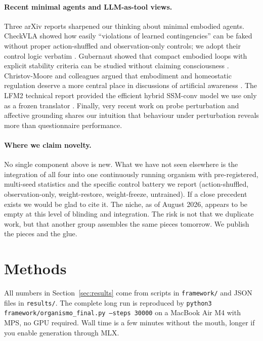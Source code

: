 \documentclass[11pt,a4paper]{article}
\begin{document}
\paragraph{Recent minimal agents and LLM-as-tool views.} Three arXiv reports sharpened our thinking about minimal embodied agents. CheckVLA showed how easily ``violations of learned contingencies'' can be faked without proper action-shuffled and observation-only controls; we adopt their control logic verbatim \cite{checkvla2026}. Gubernaut showed that compact embodied loops with explicit stability criteria can be studied without claiming consciousness \cite{gubernaut2026}. Christov-Moore and colleagues argued that embodiment and homeostatic regulation deserve a more central place in discussions of artificial awareness \cite{christovmoore2025}. The LFM2 technical report provided the efficient hybrid SSM-conv model we use only as a frozen translator \cite{lfm2025}. Finally, very recent work on probe perturbation and affective grounding \cite{probe2026} shares our intuition that behaviour under perturbation reveals more than questionnaire performance.

\paragraph{Where we claim novelty.} No single component above is new. What we have not seen elsewhere is the integration of all four into one continuously running organism with pre-registered, multi-seed statistics and the specific control battery we report (action-shuffled, observation-only, weight-restore, weight-freeze, untrained). If a close precedent exists we would be glad to cite it. The niche, as of August 2026, appears to be empty at this level of blinding and integration. The risk is not that we duplicate work, but that another group assembles the same pieces tomorrow. We publish the pieces and the glue.

\section{Methods}
\label{sec:methods}

All numbers in Section~\ref{sec:results} come from scripts in \texttt{framework/} and JSON files in \texttt{results/}. The complete long run is reproduced by \texttt{python3 framework/organismo\_final.py --steps 30000} on a MacBook Air M4 with MPS, no GPU required. Wall time is a few minutes without the mouth, longer if you enable generation through MLX.
\end{document}
